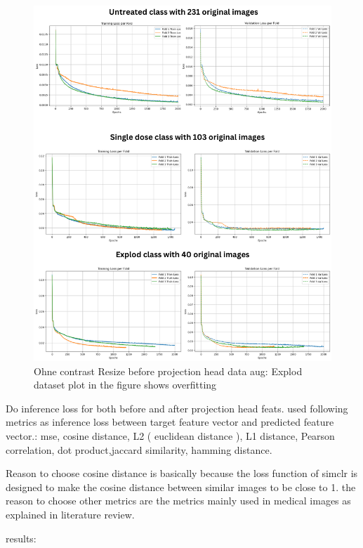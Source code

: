 \begin{figure}[H]
  \centering
  \includegraphics[scale=0.5]{figures/overfit.png} 
  \caption{Ohne contrast Resize  before projection head data aug: Explod dataset plot in the figure shows overfitting }
  \label{fig:unloss}
\end{figure}


Do inference loss for both  before and after projection head feats.
used following metrics as inference loss between target feature vector and predicted feature vector.: mse, cosine distance, L2 ( euclidean distance ), L1 distance, Pearson correlation, dot product,jaccard similarity, hamming distance.

Reason to choose cosine distance is basically because the loss function of simclr is designed to make the cosine distance between similar images to be close to 1. the reason to choose other metrics are the metrics mainly used in medical images as explained in literature review.


results:

